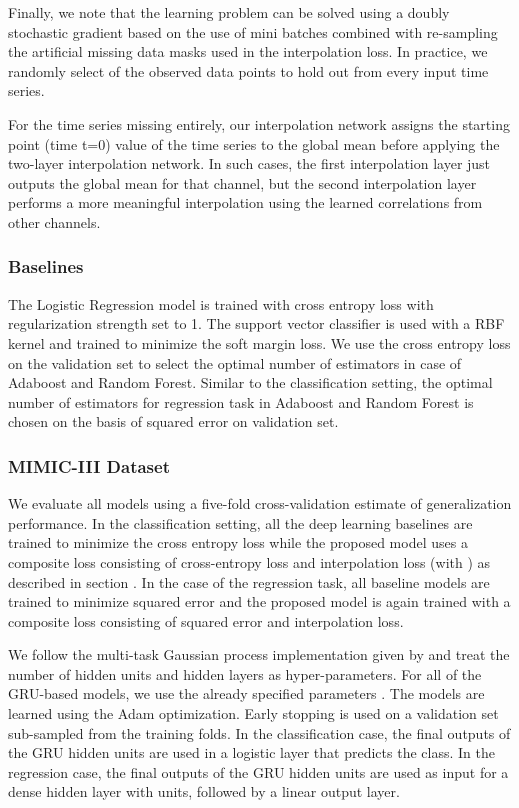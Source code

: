 \documentclass{article} \usepackage{iclr2019_conference,times}
\begin{document}
Finally, we note that the learning problem can be solved using a
doubly stochastic gradient based on the use of mini batches
combined with re-sampling the artificial missing data masks 
used in the interpolation loss. In practice, we randomly select
 of the observed data points to hold out from every input time
series. 

For the time series missing entirely, our interpolation network assigns the starting point (time t=0) value of the time series to the global mean before applying the two-layer interpolation network. In such cases, the first interpolation layer just outputs the global mean for that channel, but the second interpolation layer performs a more meaningful interpolation using the learned correlations from other channels.

\subsubsection{Baselines}
The Logistic Regression model is trained with cross entropy loss with regularization strength set to 1. The support vector classifier is used with a RBF kernel and trained to minimize the soft margin loss. We use the cross entropy loss on the validation set to select the optimal number of estimators in case of Adaboost and Random Forest. Similar to the classification setting, the optimal number of estimators for regression task in Adaboost and Random Forest is chosen on the basis of squared error on validation set.

\subsubsection*{MIMIC-III Dataset}
We evaluate all models using a five-fold cross-validation estimate of generalization performance.
In the classification setting,  all the deep learning baselines are trained to minimize the cross entropy loss while the proposed model uses a composite loss consisting of cross-entropy loss and interpolation loss (with ) as described in section . In the case of the regression task, all baseline models are trained to minimize squared error and the proposed model is again trained with a composite loss consisting of squared error and interpolation loss.

We follow the multi-task Gaussian process implementation given by \cite{futoma2017improved} and treat the number of hidden units and hidden layers as hyper-parameters.  For all of the GRU-based models, we use the already specified parameters \citep{che2016recurrent}. The models are learned using the Adam optimization. Early
stopping is used on a validation set sub-sampled from the training folds. In the classification case,
the final outputs of the GRU hidden units are used in a logistic layer that predicts the class.
In the regression case, the final outputs of the GRU hidden units
are used as input for a dense hidden layer with  units, followed by a linear output layer. 
\end{document}
